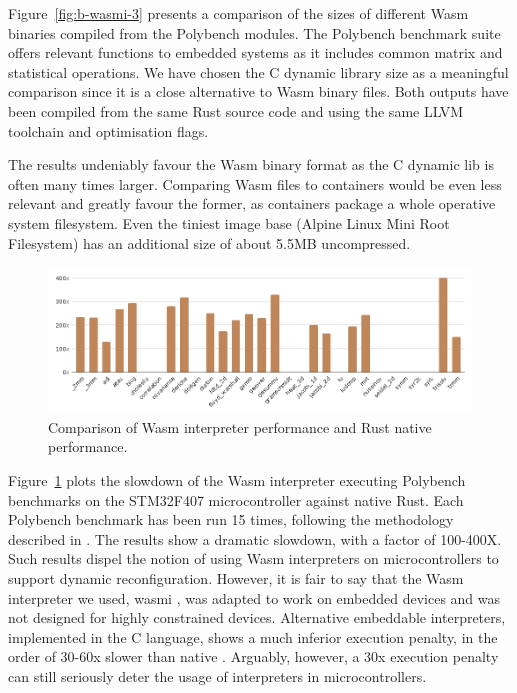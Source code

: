 Figure~\ref{fig:b-wasmi-3} presents a comparison of the sizes of different Wasm binaries compiled from the Polybench \cite{yuki2014understanding} modules. The Polybench benchmark suite offers relevant functions to embedded systems as it includes common matrix and statistical operations. We have chosen the C dynamic library size as a meaningful comparison since it is a close alternative to Wasm binary files. Both outputs have been compiled from the same Rust source code and using the same LLVM toolchain and optimisation flags.

The results undeniably favour the Wasm binary format as the C dynamic lib is often many times larger. Comparing Wasm files to containers would be even less relevant and greatly favour the former, as containers package a whole operative system filesystem. Even the tiniest image base (Alpine Linux Mini Root Filesystem) has an additional size of about 5.5MB uncompressed.

\begin{figure}[ht]
\centering
\includegraphics[width=\columnwidth]{figures/b-wasmi-4}
\caption{Comparison of Wasm interpreter performance and Rust native performance.} \label{fig:b-wasmi-4}
\end{figure}

Figure~\ref{fig:b-wasmi-4} plots the slowdown of the Wasm interpreter executing Polybench benchmarks on the STM32F407 microcontroller against native Rust. 
Each Polybench benchmark has been run 15 times, following the methodology described in \cite{wasm3-performance}. The results show a dramatic slowdown, with a factor of 100-400X. Such results dispel the notion of using Wasm interpreters on microcontrollers to support dynamic reconfiguration.
However, it is fair to say that the Wasm interpreter we used, wasmi \cite{wasmi}, was adapted to work on embedded devices and was not designed for highly constrained devices. 
Alternative embeddable interpreters, implemented in the C language, shows a much inferior  execution penalty, in the order of 30-60x slower than native \cite{peach2020ewasm}. Arguably, however, a 30x execution penalty can still seriously deter the usage of interpreters in microcontrollers.

